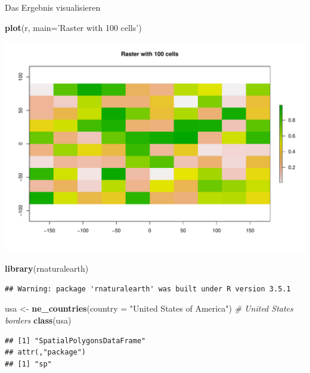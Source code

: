 \documentclass[ignorenonframetext,]{beamer}
\newenvironment{Shaded}{\begin{snugshade}}{\end{snugshade}}
\newcommand{\CommentTok}[1]{\textcolor[rgb]{0.56,0.35,0.01}{\textit{#1}}}
\newcommand{\DataTypeTok}[1]{\textcolor[rgb]{0.13,0.29,0.53}{#1}}
\newcommand{\KeywordTok}[1]{\textcolor[rgb]{0.13,0.29,0.53}{\textbf{#1}}}
\newcommand{\NormalTok}[1]{#1}
\newcommand{\StringTok}[1]{\textcolor[rgb]{0.31,0.60,0.02}{#1}}
\begin{document}
\begin{frame}[fragile]{Das Ergebnis visualisieren}
\protect\hypertarget{das-ergebnis-visualisieren}{}

\begin{Shaded}
\begin{Highlighting}[]
\KeywordTok{plot}\NormalTok{(r, }\DataTypeTok{main=}\StringTok{'Raster with 100 cells'}\NormalTok{)}
\end{Highlighting}
\end{Shaded}

\includegraphics{A8_Rasterdaten_files/figure-beamer/unnamed-chunk-5-1.pdf}

\end{frame}

\begin{frame}[fragile]{}
\protect\hypertarget{section}{}

\begin{Shaded}
\begin{Highlighting}[]
\KeywordTok{library}\NormalTok{(rnaturalearth)}
\end{Highlighting}
\end{Shaded}

\begin{verbatim}
## Warning: package 'rnaturalearth' was built under R version 3.5.1
\end{verbatim}

\begin{Shaded}
\begin{Highlighting}[]
\NormalTok{usa <-}\StringTok{ }\KeywordTok{ne_countries}\NormalTok{(}\DataTypeTok{country =} \StringTok{"United States of America"}\NormalTok{) }\CommentTok{# United States borders}
\KeywordTok{class}\NormalTok{(usa)}
\end{Highlighting}
\end{Shaded}

\begin{verbatim}
## [1] "SpatialPolygonsDataFrame"
## attr(,"package")
## [1] "sp"
\end{verbatim}

\end{frame}
\end{document}
